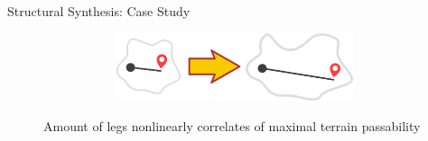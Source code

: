 \documentclass[aspectratio=169]{beamer}
\begin{document}
\begin{frame}[t]{Structural Synthesis: Case Study}
\begin{figure}[H]
    \begin{minipage}{0.58\textwidth}
        \centering\includegraphics[height=2cm,width=1\textwidth,keepaspectratio]{f3.png}
    \end{minipage}\hfill
    \begin{minipage}{0.40\textwidth}
        Amount of legs nonlinearly correlates of maximal terrain passability
        \label{fig:f3.png}
    \end{minipage}
\end{figure}
\end{frame}
\end{document}
